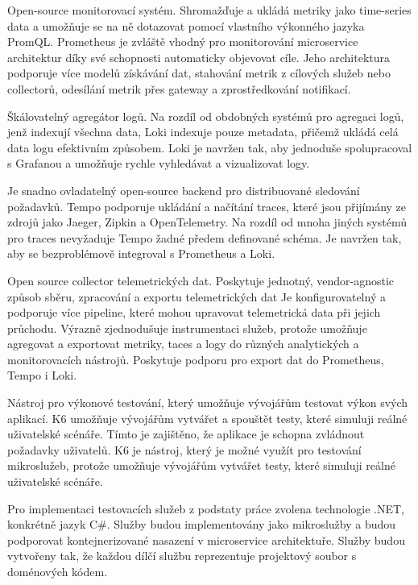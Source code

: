  
Open-source monitorovací systém. Shromažďuje a ukládá metriky jako time-series data a umožňuje se na ně dotazovat pomocí vlastního výkonného jazyka PromQL. Prometheus je zvláště vhodný pro monitorování microservice architektur díky své schopnosti automaticky objevovat cíle. Jeho architektura podporuje více modelů získávání dat, stahování metrik z cílových služeb nebo collectorů, odesílání metrik přes gateway a zprostředkování notifikací.


Škálovatelný agregátor logů. Na rozdíl od obdobných systémů pro agregaci logů, jenž indexují všechna data, Loki indexuje pouze metadata, přičemž ukládá celá data logu efektivním způsobem. Loki je navržen tak, aby jednoduše spolupracoval s Grafanou a umožňuje rychle vyhledávat a vizualizovat logy.


Je snadno ovladatelný open-source backend pro distribuované sledování požadavků. Tempo podporuje ukládání a načítání traces, které jsou přijímány ze zdrojů jako Jaeger, Zipkin a OpenTelemetry. Na rozdíl od mnoha jiných systémů pro traces nevyžaduje Tempo žadné předem definované schéma. Je navržen tak, aby se bezproblémově integroval s Prometheus a Loki.


Open source collector telemetrických dat. Poskytuje jednotný, vendor-agnostic způsob sběru, zpracování a exportu telemetrických dat  Je konfigurovatelný a podporuje více pipeline, které mohou upravovat telemetrická data při jejich průchodu. Výrazně zjednodušuje instrumentaci služeb, protože umožňuje agregovat a exportovat metriky, taces a logy do různých analytických a monitorovacích nástrojů. Poskytuje podporu pro export dat do Prometheus, Tempo i Loki.



Nástroj pro výkonové testování, který umožňuje vývojářům testovat výkon svých aplikací. K6 umožňuje vývojářům vytvářet a spouštět testy, které simuluji reálné uživatelské scénáře. Tímto je zajištěno, že aplikace je schopna zvládnout požadavky uživatelů. K6 je nástroj, který je možné využít pro testování mikroslužeb, protože umožňuje vývojářům vytvářet testy, které simuluji reálné uživatelské scénáře.


Pro implementaci testovacích služeb z podstaty práce zvolena technologie .NET, konkrétně jazyk C\#. Služby budou implementovány jako mikroslužby a budou podporovat kontejnerizované nasazení v microservice architektuře. Služby budou vytvořeny tak, že každou dílčí službu reprezentuje projektový soubor s doménových kódem. 

